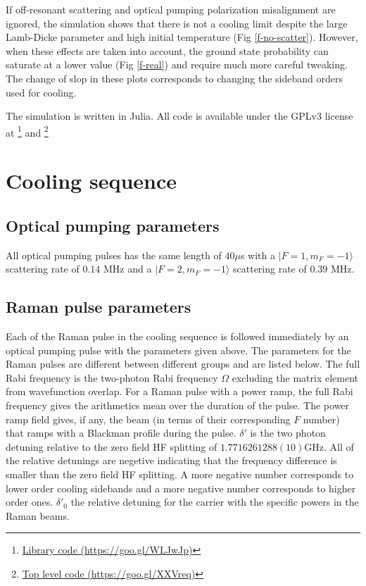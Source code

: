 \documentclass[aps,secnumarabic,amsmath,amssymb]{revtex4}
\begin{document}
If off-resonant scattering and optical pumping polarization misalignment are ignored,
the simulation shows that there is not a cooling limit
despite the large Lamb-Dicke parameter and high initial temperature (Fig \ref{f-no-scatter}).
However, when these effects are taken into account, the ground state probability can saturate at
a lower value (Fig \ref{f-real}) and require much more careful tweaking.
The change of slop in these plots corresponds to changing the sideband orders used for cooling.

The simulation is written in Julia\cite{Bezanson2017}.
All code is available under the GPLv3 license at
\footnote{\href{https://goo.gl/WLJwJp}{Library code (https://goo.gl/WLJwJp)}} and
\footnote{\href{https://goo.gl/XXVreq}{Top level code (https://goo.gl/XXVreq)}}

\section{Cooling sequence}

\subsection{Optical pumping parameters}
All optical pumping pulses has the same length of $40\mu$s
with a $|F=1,m_F=-1\rangle$ scattering rate of $0.14$ MHz
and a $|F=2,m_F=-1\rangle$ scattering rate of $0.39$ MHz.

\subsection{Raman pulse parameters}
Each of the Raman pulse in the cooling sequence is followed immediately by an optical pumping
pulse with the parameters given above.
The parameters for the Raman pulses are different between different groups and are listed below.
The full Rabi frequency is the two-photon Rabi frequency $\Omega$ excluding the matrix element
from wavefunction overlap.
For a Raman pulse with a power ramp,
the full Rabi frequency gives the arithmetics mean over the duration of the pulse.
The power ramp field gives, if any,
the beam (in terms of their corresponding $F$ number)
that ramps with a Blackman profile during the pulse.
$\delta'$ is the two photon detuning relative to the zero field HF splitting
of $1.7716261288(10)$GHz.
All of the relative detunings are negetive indicating that the frequency difference is smaller
than the zero field HF splitting.
A more negative number corresponds to lower order cooling sidebands
and a more negative number corresponds to higher order ones.
$\delta'_0$ the relative detuning for the carrier with the specific powers in the Raman beams.
\end{document}
